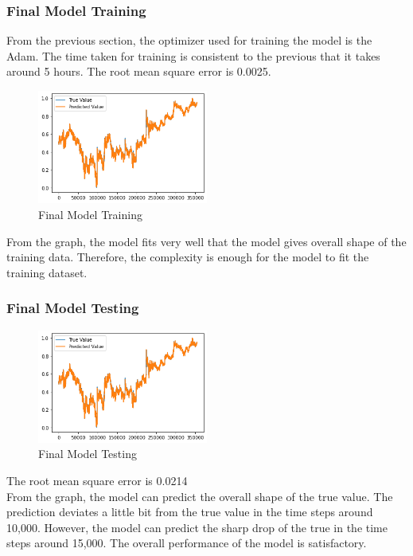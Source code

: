 \documentclass[11pt,a4paper]{article}
\begin{document}
    \subsubsection{Final Model Training}
    From the previous section, the optimizer used for training the model is the Adam. The time taken for training is consistent to the previous that it takes around 5 hours. The root mean square error is 0.0025.
    \begin{figure}[H]
        \centering
        \includegraphics[width = 0.5\textwidth]{crypto/plot/test_closing.png}
        \caption{Final Model Training}
        \label{fig:final_training}
    \end{figure}
    \noindent
    From the graph, the model fits very well that the model gives overall shape of the training data. Therefore, the complexity is enough for the model to fit the training dataset.
    
    \subsubsection{Final Model Testing}
        \begin{figure}[H]
        \centering
        \includegraphics[width = 0.5\textwidth]{crypto/plot/test_spread.png}
        \caption{Final Model Testing}
        \label{fig:final_testing}
    \end{figure}
    \noindent
    The root mean square error is 0.0214 \\
    From the graph, the model can predict the overall shape of the true value. The prediction deviates a little bit from the true value in the time steps around 10,000. However, the model can predict the sharp drop of the true in the time steps around 15,000. The overall performance of the model is satisfactory.
    
\end{document}
